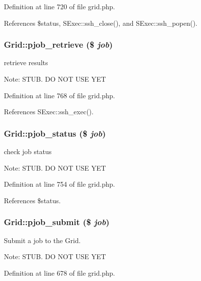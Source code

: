 Definition at line 720 of file grid.php.

References \$status, SExec::ssh\_\-close(), and SExec::ssh\_\-popen().
\subsubsection{\setlength{\rightskip}{0pt plus 5cm}Grid::pjob\_\-retrieve (\$ {\em job})}\label{classGrid_a16}


retrieve results 

\begin{Desc}
\item[Note:]STUB. DO NOT USE YET \end{Desc}


Definition at line 768 of file grid.php.

References SExec::ssh\_\-exec().
\subsubsection{\setlength{\rightskip}{0pt plus 5cm}Grid::pjob\_\-status (\$ {\em job})}\label{classGrid_a15}


check job status 

\begin{Desc}
\item[Note:]STUB. DO NOT USE YET \end{Desc}


Definition at line 754 of file grid.php.

References \$status.
\subsubsection{\setlength{\rightskip}{0pt plus 5cm}Grid::pjob\_\-submit (\$ {\em job})}\label{classGrid_a13}


Submit a job to the Grid. 

\begin{Desc}
\item[Note:]STUB. DO NOT USE YET \end{Desc}


Definition at line 678 of file grid.php.
